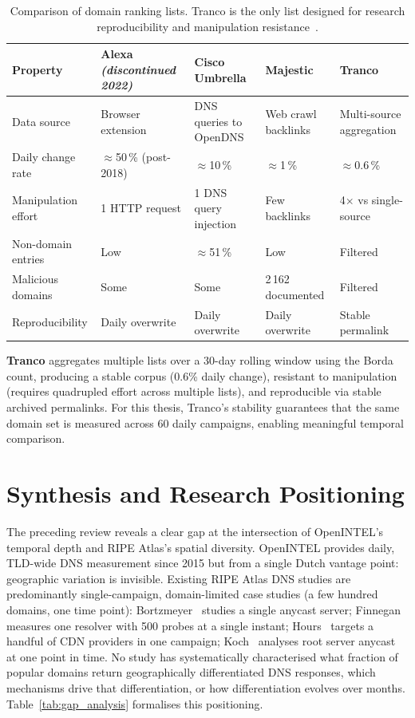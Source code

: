 \begin{table}[tp]
\centering
\small
\begin{tabularx}{\linewidth}{p{2.2cm} X X X X}
\toprule
\textbf{Property} & \textbf{Alexa} \newline \textit{(discontinued 2022)} & \textbf{Cisco Umbrella} & \textbf{Majestic} & \textbf{Tranco} \\
\midrule
Data source  & Browser extension & \ac{DNS} queries to OpenDNS & Web crawl backlinks & Multi-source aggregation \\
Daily change rate & $\approx$50\,\% (post-2018) & $\approx$10\,\% & $\approx$1\,\% & $\approx$0.6\,\% \\
Manipulation effort & 1 \ac{HTTP} request & 1 \ac{DNS} query injection & Few backlinks & 4$\times$ vs single-source \\
Non-domain entries & Low & $\approx$51\,\% & Low & Filtered \\
Malicious domains & Some & Some & 2\,162 documented & Filtered \\
Reproducibility   & Daily overwrite & Daily overwrite & Daily overwrite & Stable permalink \\
\bottomrule
\end{tabularx}
\caption{Comparison of domain ranking lists. Tranco is the only list designed for research reproducibility and manipulation resistance~\cite{LePochat2019}.}
\label{tab:ranking_lists}
\end{table}

\textbf{Tranco} \cite{LePochat2019} aggregates multiple lists over a 30-day rolling window using the Borda count, producing a stable corpus (0.6\% daily change), resistant to manipulation (requires quadrupled effort across multiple lists), and reproducible via stable archived permalinks. For this thesis, Tranco’s stability guarantees that the same domain set is measured across 60 daily campaigns, enabling meaningful temporal comparison.

\section{Synthesis and Research Positioning}
\label{sec:2.7}

The preceding review reveals a clear gap at the intersection of OpenINTEL’s temporal depth and RIPE Atlas’s spatial diversity. OpenINTEL provides daily, \ac{TLD}-wide \ac{DNS} measurement since 2015 but from a single Dutch vantage point: geographic variation is invisible. Existing RIPE Atlas \ac{DNS} studies are predominantly single-campaign, domain-limited case studies (a few hundred domains, one time point): Bortzmeyer~\cite{Bortzmeyer2013} studies a single anycast server; Finnegan~\cite{Finnegan2018} measures one resolver with 500 probes at a single instant; Hours~\cite{Hours2016} targets a handful of \ac{CDN} providers in one campaign; Koch~\cite{Koch2021} analyses root server anycast at one point in time. No study has systematically characterised what fraction of popular domains return geographically differentiated \ac{DNS} responses, which mechanisms drive that differentiation, or how differentiation evolves over months. Table~\ref{tab:gap_analysis} formalises this positioning.

